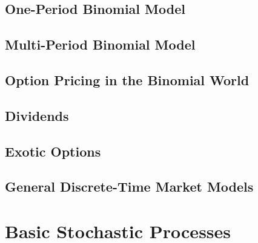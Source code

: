 \documentclass[11pt,fleqn]{book} %
\begin{document}

\section{One-Period Binomial Model}


\section{Multi-Period Binomial Model}


\section{Option Pricing in the Binomial World}


\section{Dividends}


\section{Exotic Options}


\section{General Discrete-Time Market Models}



\chapter{Basic Stochastic Processes}
\end{document}
